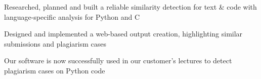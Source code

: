 \documentclass[]{lukas-cv}
\begin{document}
\begin{minipage}[t]{0.66\textwidth}

\begin{tightemize}
    \item Researched, planned and built a reliable similarity detection for text \& code with language-specific analysis for
    Python and C
    \item Designed and implemented a web-based output creation, highlighting similar submissions and plagiarism cases
    \item Our software is now successfully used in our customer's lectures to detect plagiarism cases on Python code
\end{tightemize}



% 
% 

\end{minipage}
\end{document}
